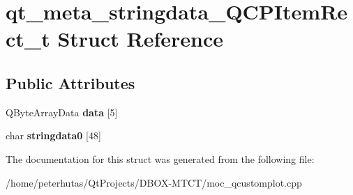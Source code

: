 \hypertarget{structqt__meta__stringdata___q_c_p_item_rect__t}{}\section{qt\+\_\+meta\+\_\+stringdata\+\_\+\+Q\+C\+P\+Item\+Rect\+\_\+t Struct Reference}
\label{structqt__meta__stringdata___q_c_p_item_rect__t}
\subsection*{Public Attributes}
\begin{DoxyCompactItemize}
\item 
\mbox{\label{structqt__meta__stringdata___q_c_p_item_rect__t_ab5a84b5db36cb982466a0b732f5e090f}} 
Q\+Byte\+Array\+Data {\bfseries data} \mbox{[}5\mbox{]}
\item 
\mbox{\label{structqt__meta__stringdata___q_c_p_item_rect__t_a216a9c8bff154ce0d04ce8eb79a5d408}} 
char {\bfseries stringdata0} \mbox{[}48\mbox{]}
\end{DoxyCompactItemize}


The documentation for this struct was generated from the following file\+:\begin{DoxyCompactItemize}
\item 
/home/peterhutas/\+Qt\+Projects/\+D\+B\+O\+X-\/\+M\+T\+C\+T/moc\+\_\+qcustomplot.\+cpp\end{DoxyCompactItemize}
